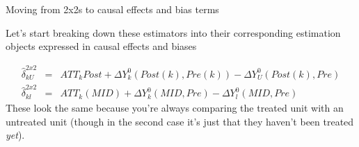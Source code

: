 \documentclass{beamer}
\begin{document}




\begin{frame}{Moving from 2x2s to causal effects and bias terms}

Let's start breaking down these estimators into their corresponding estimation objects expressed in causal effects and biases


\begin{eqnarray*}
\widehat{\delta}^{2x2}_{kU} &=& ATT_k{Post} + \Delta Y^0_k(Post(k),Pre(k)) - \Delta Y^0_U(Post(k),Pre) \\
\widehat{\delta}^{2x2}_{kl} &=& ATT_k(MID) + \Delta Y^0_k(MID,Pre) - \Delta Y^0_l(MID, Pre)
\end{eqnarray*}These look the same because you're always comparing the treated unit with an untreated unit (though in the second case it's just that they haven't been treated \emph{yet}). 

\end{frame}
\end{document}
